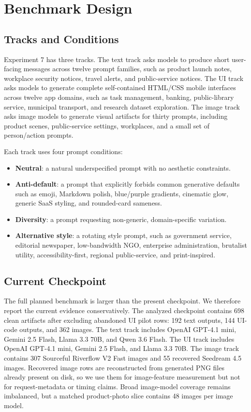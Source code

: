 \documentclass[10pt]{article}
\begin{document}
\section{Benchmark Design}

\subsection{Tracks and Conditions}

Experiment 7 has three tracks. The text track asks models to produce short user-facing messages across twelve prompt families, such as product launch notes, workplace security notices, travel alerts, and public-service notices. The UI track asks models to generate complete self-contained HTML/CSS mobile interfaces across twelve app domains, such as task management, banking, public-library service, municipal transport, and research dataset exploration. The image track asks image models to generate visual artifacts for thirty prompts, including product scenes, public-service settings, workplaces, and a small set of person/action prompts.

Each track uses four prompt conditions:
\begin{itemize}
  \item \textbf{Neutral}: a natural underspecified prompt with no aesthetic constraints.
  \item \textbf{Anti-default}: a prompt that explicitly forbids common generative defaults such as emoji, Markdown polish, blue/purple gradients, cinematic glow, generic SaaS styling, and rounded-card sameness.
  \item \textbf{Diversity}: a prompt requesting non-generic, domain-specific variation.
  \item \textbf{Alternative style}: a rotating style prompt, such as government service, editorial newspaper, low-bandwidth NGO, enterprise administration, brutalist utility, accessibility-first, regional public-service, and print-inspired.
\end{itemize}

\subsection{Current Checkpoint}

The full planned benchmark is larger than the present checkpoint. We therefore report the current evidence conservatively. The analyzed checkpoint contains 698 clean artifacts after excluding abandoned UI pilot rows: 192 text outputs, 144 UI-code outputs, and 362 images. The text track includes OpenAI GPT-4.1 mini, Gemini 2.5 Flash, Llama 3.3 70B, and Qwen 3.6 Flash. The UI track includes OpenAI GPT-4.1 mini, Gemini 2.5 Flash, and Llama 3.3 70B. The image track contains 307 Sourceful Riverflow V2 Fast images and 55 recovered Seedream 4.5 images. Recovered image rows are reconstructed from generated PNG files already present on disk, so we use them for image-feature measurement but not for request-metadata or timing claims. Broad image-model coverage remains imbalanced, but a matched product-photo slice contains 48 images per image model.
\end{document}
